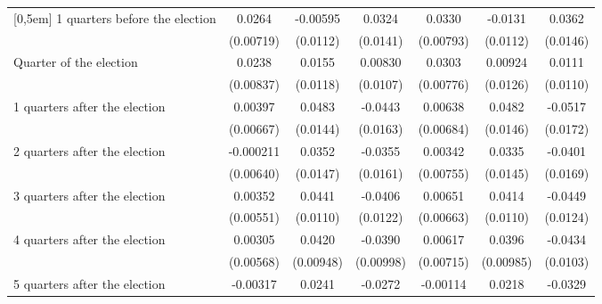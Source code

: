\begin{table}[!ht]
\begin{tabular}{l*{6}{c}}
[0,5em]
 1 quarters before the election&      0.0264\sym{***}&    -0.00595         &      0.0324\sym{*}  &      0.0330\sym{***}&     -0.0131         &      0.0362\sym{*}  \\
                    &   (0.00719)         &    (0.0112)         &    (0.0141)         &   (0.00793)         &    (0.0112)         &    (0.0146)         \\
[0,5em]
Quarter of the election&      0.0238\sym{**} &      0.0155         &     0.00830         &      0.0303\sym{***}&     0.00924         &      0.0111         \\
                    &   (0.00837)         &    (0.0118)         &    (0.0107)         &   (0.00776)         &    (0.0126)         &    (0.0110)         \\
[0,5em]
 1 quarters after the election&     0.00397         &      0.0483\sym{***}&     -0.0443\sym{**} &     0.00638         &      0.0482\sym{***}&     -0.0517\sym{**} \\
                    &   (0.00667)         &    (0.0144)         &    (0.0163)         &   (0.00684)         &    (0.0146)         &    (0.0172)         \\
[0,5em]
 2 quarters after the election&   -0.000211         &      0.0352\sym{*}  &     -0.0355\sym{*}  &     0.00342         &      0.0335\sym{*}  &     -0.0401\sym{*}  \\
                    &   (0.00640)         &    (0.0147)         &    (0.0161)         &   (0.00755)         &    (0.0145)         &    (0.0169)         \\
[0,5em]
 3 quarters after the election&     0.00352         &      0.0441\sym{***}&     -0.0406\sym{***}&     0.00651         &      0.0414\sym{***}&     -0.0449\sym{***}\\
                    &   (0.00551)         &    (0.0110)         &    (0.0122)         &   (0.00663)         &    (0.0110)         &    (0.0124)         \\
[0,5em]
 4 quarters after the election&     0.00305         &      0.0420\sym{***}&     -0.0390\sym{***}&     0.00617         &      0.0396\sym{***}&     -0.0434\sym{***}\\
                    &   (0.00568)         &   (0.00948)         &   (0.00998)         &   (0.00715)         &   (0.00985)         &    (0.0103)         \\
[0,5em]
 5 quarters after the election&    -0.00317         &      0.0241\sym{*}  &     -0.0272\sym{**} &    -0.00114         &      0.0218\sym{*}  &     -0.0329\sym{**} \\

\end{tabular}
\end{table}
